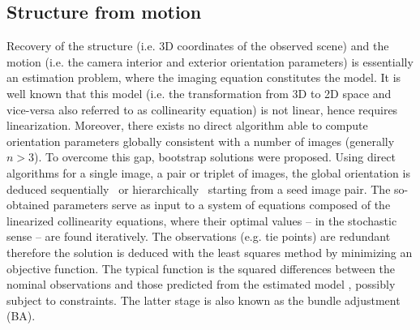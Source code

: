 \documentclass[twocolumn]{bmcart}%
\begin{document}
\subsection*{Structure from motion}
Recovery of the structure (i.e. 3D coordinates of the observed scene) and the motion (i.e. the camera interior and exterior orientation parameters) is essentially an estimation problem, where the imaging equation constitutes the model. It is well known that this model (i.e. the transformation from 3D to 2D space and vice-versa also referred to as collinearity equation) is not linear, hence requires linearization. Moreover, there exists no direct algorithm able to compute orientation parameters globally consistent with a number of images (generally $n>3$). To overcome this gap, bootstrap solutions were proposed. Using direct algorithms for a single image, a pair or triplet of images, the global orientation is deduced sequentially~\cite{snavely2006photo} or hierarchically~\cite{toldo2015hierarchical} starting from a seed image pair. The so-obtained parameters serve as input to a system of equations composed of the linearized collinearity equations, where their optimal values -- in the stochastic sense -- are found iteratively. The observations (e.g. tie points) are redundant therefore the solution is deduced with the least squares method by minimizing an objective function. The typical function is the squared differences between the nominal observations and those predicted from the estimated model%
, possibly subject to constraints. The latter stage is also known as the bundle adjustment (BA).\par 
%
\end{document}
